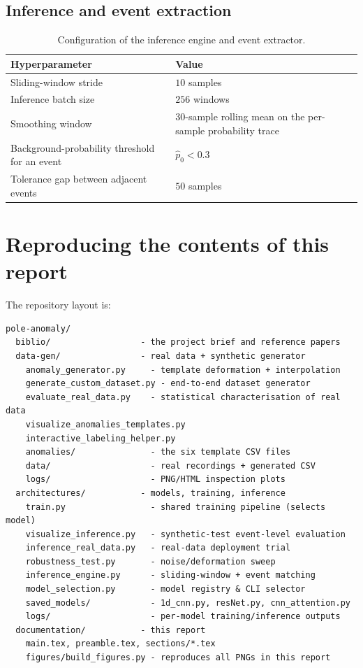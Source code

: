 \subsection{Inference and event extraction}
\label{app:hp-inf}

\begin{table}[H]
    \centering
    \footnotesize
    \begin{tabular}{ll}
        \toprule
        Hyperparameter & Value \\
        \midrule
        Sliding-window stride & $10$ samples \\
        Inference batch size  & $256$ windows \\
        Smoothing window      & $30$-sample rolling mean on the per-sample probability trace \\
        Background-probability threshold for an event & $\hat{p}_0 < 0.3$ \\
        Tolerance gap between adjacent events & $50$ samples \\
        \bottomrule
    \end{tabular}
    \caption{Configuration of the inference engine and event extractor.}
    \label{tab:inf-config}
\end{table}

\section{Reproducing the contents of this report}
\label{app:reproduce}

The repository layout is:
\begin{lstlisting}[basicstyle=\ttfamily\footnotesize, caption={Top-level project structure.}]
pole-anomaly/
  biblio/                  - the project brief and reference papers
  data-gen/                - real data + synthetic generator
    anomaly_generator.py     - template deformation + interpolation
    generate_custom_dataset.py - end-to-end dataset generator
    evaluate_real_data.py    - statistical characterisation of real data
    visualize_anomalies_templates.py
    interactive_labeling_helper.py
    anomalies/               - the six template CSV files
    data/                    - real recordings + generated CSV
    logs/                    - PNG/HTML inspection plots
  architectures/           - models, training, inference
    train.py                 - shared training pipeline (selects model)
    visualize_inference.py   - synthetic-test event-level evaluation
    inference_real_data.py   - real-data deployment trial
    robustness_test.py       - noise/deformation sweep
    inference_engine.py      - sliding-window + event matching
    model_selection.py       - model registry & CLI selector
    saved_models/            - 1d_cnn.py, resNet.py, cnn_attention.py
    logs/                    - per-model training/inference outputs
  documentation/           - this report
    main.tex, preamble.tex, sections/*.tex
    figures/build_figures.py - reproduces all PNGs in this report
\end{lstlisting}

